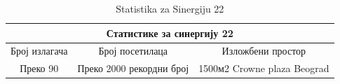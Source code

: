 \documentclass[12pt]{article}
\begin{document}
\begin{table}[h!]
\begin{center}
\begin{tabular}{|ccc|} \hline
\multicolumn{3}{|c|}{Статистике за синергију 22}                                                                  \\ \hline
\multicolumn{1}{|c|}{Број излагача} & \multicolumn{1}{c|}{Број посетилаца}          & Изложбени простор           \\ \hline
\multicolumn{1}{|c|}{Преко 90}      & \multicolumn{1}{c|}{Преко 2000 рекордни број} & 1500м2 Crowne plaza Beograd \\ \hline
\end{tabular}
\caption{Statistika za Sinergiju 22}
\label{tab:tabela1}
\end{center}
\end{table}
\end{document}
